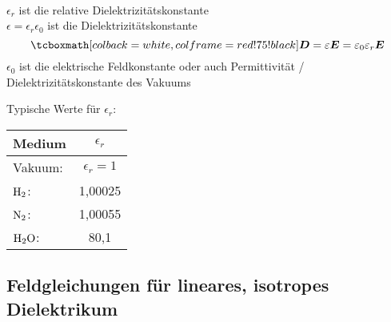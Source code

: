 \begin{enumerate}[i)]
\begin{align*}
	\end{align*}
	\begin{minipage}{.6\linewidth}
		$ \epsilon_r $ ist die relative Dielektrizitätskonstante\\
		$ \epsilon = \epsilon_r \epsilon_0 $ ist die Dielektrizitätskonstante
		\begin{equation*}
		\rmbox{\vec{D} = \epsilon \vec{E} = \epsilon_0 \epsilon_r \vec{E}}
		\end{equation*}
		$ \epsilon_0 $ ist die elektrische Feldkonstante oder auch Permittivität / Dielektrizitätskonstante des Vakuums
	\end{minipage}%
	\begin{minipage}{.4\linewidth}
		\flushleft
		Typische Werte für $ \epsilon_r $:\\[5pt]
		\centering
		\begin{tabular}{l|c}
			Medium & $ \epsilon_r $ \\ \hline 
			Vakuum: & $ \epsilon_r = 1 $ \\
			$ \textrm{H}_2 $: & 1,00025 \\
			$ \textrm{N}_2 $: & 1,00055 \\
			$ \textrm{H}_2 \textrm{O} $: & 80,1
		\end{tabular}
	\end{minipage}%
\end{enumerate}

\subsection{Feldgleichungen für lineares, isotropes Dielektrikum} %

